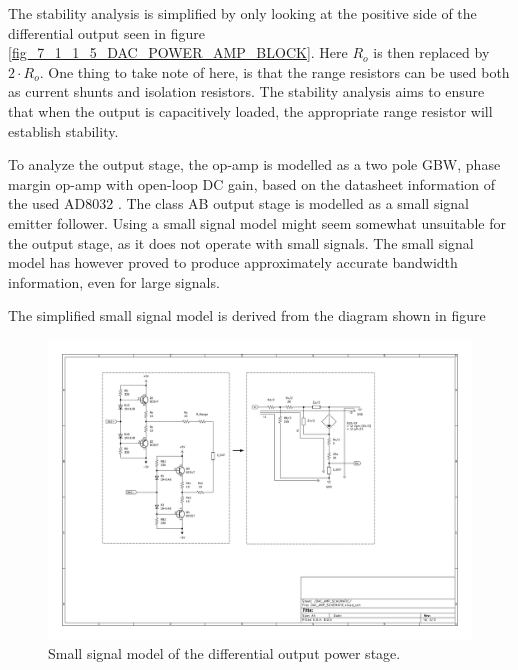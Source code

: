 The stability analysis is simplified by only looking at the positive side of the differential output seen in figure \ref{fig_7_1_1_5_DAC_POWER_AMP_BLOCK}. Here $R_o$ is then replaced by $2\cdot R_o$. One thing to take note of here, is that the range resistors can be used both as current shunts and isolation resistors. The stability analysis aims to ensure that when the output is capacitively loaded, the appropriate range resistor will establish stability.

To analyze the output stage, the op-amp is modelled as a two pole  GBW,  phase margin op-amp with  open-loop DC gain, based on the datasheet information of the used AD8032 \cite{AD8032_datasheet}. The class AB output stage is modelled as a small signal emitter follower. Using a small signal model might seem somewhat unsuitable for the output stage, as it does not operate with small signals. The small signal model has however proved to produce approximately accurate bandwidth information, even for large signals.

The simplified small signal model is derived from the diagram shown in figure 

\begin{figure}[H]
    \centering
    \includegraphics[clip, trim=80 150 100 50, width=1\textwidth]{Sections/7_SystemDesign/Figures/DAC_POWER_ss.pdf}
    \caption{Small signal model of the differential output power stage.}
    \label{fig_7_1_1_5_DAC_POWER_AMP_ss}
\end{figure}

